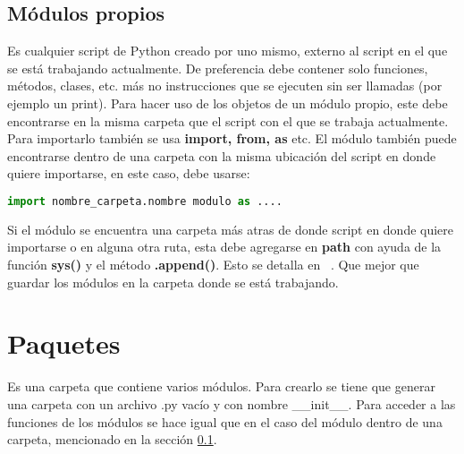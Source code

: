 \documentclass[10pt,oneside]{article}
\begin{document}
\begin{multicols}{2}
                
                \subsection{Módulos propios}\label{sec:mod}
                
                Es cualquier script de Python creado por uno mismo, externo al script en el que se está trabajando actualmente. De preferencia debe contener solo funciones, métodos, clases, etc. más no instrucciones que se ejecuten sin ser llamadas (por ejemplo un print). Para hacer uso de los objetos de un módulo propio, este debe encontrarse en la misma carpeta que el script con el que se trabaja actualmente. Para importarlo también se usa \textbf{import, from, as} etc. El módulo también puede encontrarse dentro de una carpeta con la misma ubicación del script en donde quiere importarse, en este caso, debe usarse: 

                \begin{lstlisting}[language=Python]
import nombre_carpeta.nombre modulo as ....                    
                \end{lstlisting}

                Si el módulo se encuentra una carpeta más atras de donde script en donde quiere importarse o en alguna otra ruta, esta debe agregarse en \textbf{path} con ayuda de la función \textbf{sys()} y el método \textbf{.append()}. Esto se detalla en ~\cite{PythonDalto}. Que mejor que guardar los módulos en la carpeta donde se está trabajando.

            \section{Paquetes}

                Es una carpeta que contiene varios módulos. Para crearlo se tiene que generar una carpeta con un archivo .py vacío y con nombre \_\_init\_\_. Para acceder a las funciones de los módulos se hace igual que en el caso del módulo dentro de una carpeta, mencionado en la sección \ref{sec:mod}. 



                    
    \end{multicols}   


    
    
   
        
    
\end{document}
